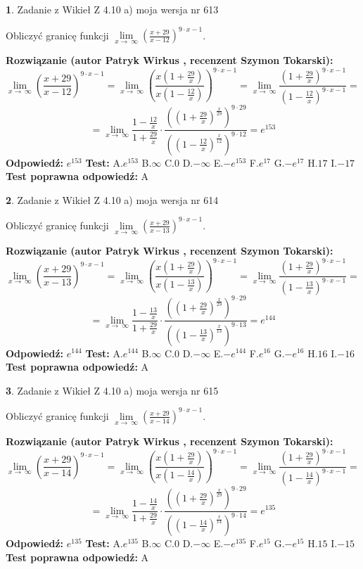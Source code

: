 \documentclass[12pt, a4paper]{article}
\theoremstyle{definition} %
\newtheorem{zad}{}
\newcommand{\zadStart}[1]{\begin{zad}#1\newline}
\newcommand{\zadStop}{\end{zad}}
\newcommand{\rozwStart}[2]{\noindent \textbf{Rozwiązanie (autor #1 , recenzent #2): }\newline}
\newcommand{\rozwStop}{\newline}
\newcommand{\odpStart}{\noindent \textbf{Odpowiedź:}\newline}
\newcommand{\odpStop}{\newline}
\newcommand{\testStart}{\noindent \textbf{Test:}\newline}
\newcommand{\testStop}{\newline}
\newcommand{\kluczStart}{\noindent \textbf{Test poprawna odpowiedź:}\newline}
\newcommand{\kluczStop}{\newline}
\begin{document}
\zadStart{Zadanie z Wikieł Z 4.10 a) moja wersja nr 613}

Obliczyć granicę funkcji  $\lim\limits_{x\to\ \infty}(\frac{x+29}{x-12})^{9\cdot x-1}$.
\zadStop
\rozwStart{Patryk Wirkus}{Szymon Tokarski}
$$\lim\limits_{x\to\ \infty}(\frac{x+29}{x-12})^{9\cdot x-1} = \lim\limits_{x\to\ \infty}(\frac{x(1+\frac{29}{x})}{x(1-\frac{12}{x})})^{9\cdot x-1}=\lim\limits_{x\to\ \infty}\frac{(1+\frac{29}{x})^{9\cdot x-1}}{(1-\frac{12}{x})^{9\cdot x-1}}=$$
$$=\lim\limits_{x\to\ \infty}\frac{1-\frac{12}{x}}{1+\frac{29}{x}}\cdot\frac{((1+\frac{29}{x})^{\frac{x}{29}})^{9\cdot29}}{((1-\frac{12}{x})^{\frac{x}{12}})^{9\cdot12}}=e^{153}$$
\rozwStop
\odpStart
$e^{153}$
\odpStop
\testStart
A.$e^{153}$ B.$\infty$ C.$0$ D.$-\infty$ E.$-e^{153}$
F.$e^{17}$ G.$-e^{17}$
H.$17$
I.$-17$
\testStop
\kluczStart
A
\kluczStop



\zadStart{Zadanie z Wikieł Z 4.10 a) moja wersja nr 614}

Obliczyć granicę funkcji  $\lim\limits_{x\to\ \infty}(\frac{x+29}{x-13})^{9\cdot x-1}$.
\zadStop
\rozwStart{Patryk Wirkus}{Szymon Tokarski}
$$\lim\limits_{x\to\ \infty}(\frac{x+29}{x-13})^{9\cdot x-1} = \lim\limits_{x\to\ \infty}(\frac{x(1+\frac{29}{x})}{x(1-\frac{13}{x})})^{9\cdot x-1}=\lim\limits_{x\to\ \infty}\frac{(1+\frac{29}{x})^{9\cdot x-1}}{(1-\frac{13}{x})^{9\cdot x-1}}=$$
$$=\lim\limits_{x\to\ \infty}\frac{1-\frac{13}{x}}{1+\frac{29}{x}}\cdot\frac{((1+\frac{29}{x})^{\frac{x}{29}})^{9\cdot29}}{((1-\frac{13}{x})^{\frac{x}{13}})^{9\cdot13}}=e^{144}$$
\rozwStop
\odpStart
$e^{144}$
\odpStop
\testStart
A.$e^{144}$ B.$\infty$ C.$0$ D.$-\infty$ E.$-e^{144}$
F.$e^{16}$ G.$-e^{16}$
H.$16$
I.$-16$
\testStop
\kluczStart
A
\kluczStop



\zadStart{Zadanie z Wikieł Z 4.10 a) moja wersja nr 615}

Obliczyć granicę funkcji  $\lim\limits_{x\to\ \infty}(\frac{x+29}{x-14})^{9\cdot x-1}$.
\zadStop
\rozwStart{Patryk Wirkus}{Szymon Tokarski}
$$\lim\limits_{x\to\ \infty}(\frac{x+29}{x-14})^{9\cdot x-1} = \lim\limits_{x\to\ \infty}(\frac{x(1+\frac{29}{x})}{x(1-\frac{14}{x})})^{9\cdot x-1}=\lim\limits_{x\to\ \infty}\frac{(1+\frac{29}{x})^{9\cdot x-1}}{(1-\frac{14}{x})^{9\cdot x-1}}=$$
$$=\lim\limits_{x\to\ \infty}\frac{1-\frac{14}{x}}{1+\frac{29}{x}}\cdot\frac{((1+\frac{29}{x})^{\frac{x}{29}})^{9\cdot29}}{((1-\frac{14}{x})^{\frac{x}{14}})^{9\cdot14}}=e^{135}$$
\rozwStop
\odpStart
$e^{135}$
\odpStop
\testStart
A.$e^{135}$ B.$\infty$ C.$0$ D.$-\infty$ E.$-e^{135}$
F.$e^{15}$ G.$-e^{15}$
H.$15$
I.$-15$
\testStop
\kluczStart
A
\kluczStop
\end{document}

